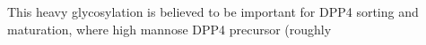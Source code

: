 This heavy glycosylation is believed to be important for DPP4 sorting and maturation, where high mannose DPP4 precursor (roughly  \cite{Matter_1991}